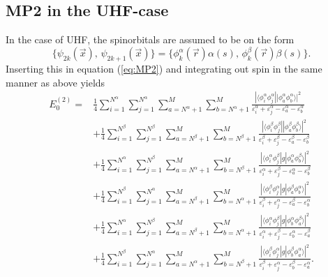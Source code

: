 \subsection{MP2 in the UHF-case}
In the case of UHF, the spinorbitals are assumed to be on the form
\begin{equation}
 \{\psi_{2k}(\vec x),\, \psi_{2k+1}(\vec x)\} = \{\phi^\alpha_{k}(\vec r)\alpha(s),\,\phi^\beta_k(\vec r)\beta(s)\}.
\end{equation}
Inserting this in equation (\ref{eq:MP2}) and integrating out spin in the same manner as above yields
\begin{equation}
 \begin{split}
  E^{(2)}_0 = & \frac{1}{4}\sum_{i=1}^{N^\alpha}\sum_{j=1}^{N^\alpha}\sum_{a=N^\alpha+1}^M\sum_{b=N^\alpha+1}^M\frac{|\langle\phi_i^\alpha \phi_j^\alpha||\phi_a^\alpha \phi_b^\alpha\rangle|^2}{\varepsilon^\alpha_i + \varepsilon^\alpha_j - \varepsilon^\alpha_a - \varepsilon^\alpha_b}  \\
              & +\frac{1}{4}\sum_{i=1}^{N^\beta}\sum_{j=1}^{N^\beta}\sum_{a=N^\beta+1}^M\sum_{b=N^\beta+1}^M\frac{|\langle\phi_i^\beta \phi_j^\beta||\phi_a^\beta \phi_b^\beta\rangle|^2}{\varepsilon^\beta_i + \varepsilon^\beta_j - \varepsilon^\beta_a - \varepsilon^\beta_b}  \\
              & +\frac{1}{4}\sum_{i=1}^{N^\alpha}\sum_{j=1}^{N^\beta}\sum_{a=N^\alpha+1}^M\sum_{b=N^\beta+1}^M\frac{|\langle\phi_i^\alpha \phi_j^\beta|g|\phi_a^\alpha \phi_b^\beta\rangle|^2}{\varepsilon^\alpha_i + \varepsilon^\beta_j - \varepsilon^\alpha_a - \varepsilon^\beta_b}  \\
              & +\frac{1}{4}\sum_{i=1}^{N^\beta}\sum_{j=1}^{N^\alpha}\sum_{a=N^\beta+1}^M\sum_{b=N^\alpha+1}^M\frac{|\langle\phi_i^\beta \phi_j^\alpha|g|\phi_a^\beta \phi_b^\alpha\rangle|^2}{\varepsilon^\beta_i + \varepsilon^\alpha_j - \varepsilon^\beta_a - \varepsilon^\alpha_b}  \\
              & +\frac{1}{4}\sum_{i=1}^{N^\alpha}\sum_{j=1}^{N^\beta}\sum_{a=N^\beta+1}^M\sum_{b=N^\alpha+1}^M\frac{|\langle\phi_i^\alpha \phi_j^\beta|g|\phi_b^\alpha \phi_a^\beta\rangle|^2}{\varepsilon^\alpha_i + \varepsilon^\beta_j - \varepsilon^\alpha_b - \varepsilon^\beta_a}  \\
              & +\frac{1}{4}\sum_{i=1}^{N^\beta}\sum_{j=1}^{N^\alpha}\sum_{a=N^\alpha+1}^M\sum_{b=N^\beta+1}^M\frac{|\langle\phi_i^\beta \phi_j^\alpha|g|\phi_b^\beta \phi_a^\alpha\rangle|^2}{\varepsilon^\beta_i + \varepsilon^\alpha_j - \varepsilon^\beta_b - \varepsilon^\alpha_a}.
 \end{split}
\end{equation}
